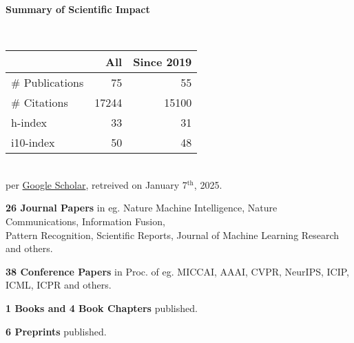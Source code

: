 \headedsection %
{\bf Summary of Scientific Impact}{}{}
{
    \qquad~~~~
    \begin{minipage}[t]{0.6\textwidth}
        \begin{tabular}{lrr}
        \hline
         & All & Since 2019\\
        \hline
        \# Publications & 75     & 55    \\
        \# Citations    & 17244  & 15100 \\
        h-index         & 33     & 31    \\
        i10-index       & 50     & 48    \\
        \hline
    \end{tabular}
    \\
    {\footnotesize{
        per \href{https://scholar.google.com/citations?user=wpLQuroAAAAJ}{Google Scholar},
        retreived on January 7$^\text{th}$, 2025.
        }
    }
    \end{minipage}

    \ifdefined\shortcv
        \vstep
        {\bf 26 Journal Papers} in eg. Nature Machine Intelligence, Nature Communications, Information Fusion,\\
        \hspace*{\fill} Pattern Recognition, Scientific Reports, Journal of Machine Learning Research and others.

        {\bf 38 Conference Papers} in Proc. of eg. MICCAI, AAAI, CVPR, NeurIPS, ICIP, ICML, ICPR and others.

        {\bf 1 Books and 4 Book Chapters} published.

        {\bf 6 Preprints} published.
        
    \else
        {}
    \fi

}
